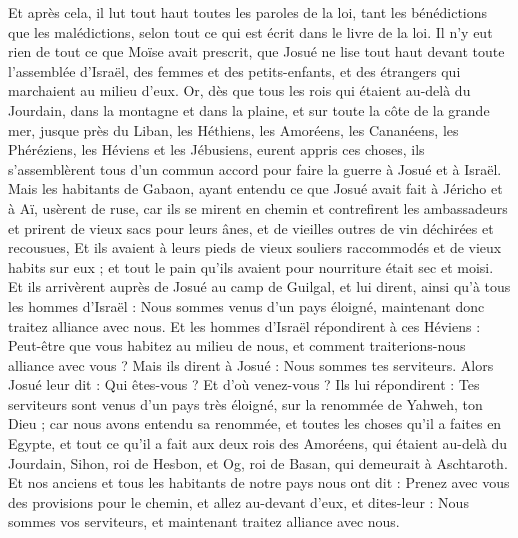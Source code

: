 \begin{multicols}{2}
Et après cela, il lut tout haut toutes les paroles de la loi, tant les bénédictions que les malédictions, selon tout ce qui est écrit dans le livre de la loi.
Il n'y eut rien de tout ce que Moïse avait prescrit, que Josué ne lise tout haut devant toute l'assemblée d'Israël, des femmes et des petits-enfants, et des étrangers qui marchaient au milieu d'eux.
\VerseOne{}Or, dès que  tous les rois qui étaient au-delà du Jourdain, dans la montagne et dans la plaine, et sur toute la côte de la grande mer, jusque près du Liban, les Héthiens, les Amoréens, les Cananéens, les Phéréziens, les Héviens et les Jébusiens, eurent appris ces choses,
ils s'assemblèrent tous d'un commun accord pour faire la guerre à Josué et à Israël.
Mais les habitants de Gabaon, ayant entendu ce que Josué avait fait à Jéricho et à Aï,
usèrent de ruse, car ils se mirent en chemin et contrefirent les ambassadeurs et prirent de vieux sacs pour leurs ânes, et de vieilles outres de vin déchirées et recousues,
Et ils avaient à leurs pieds de vieux souliers raccommodés et de vieux habits sur eux ; et tout le pain qu'ils avaient pour nourriture était sec et moisi.
Et ils arrivèrent auprès de Josué au camp de Guilgal, et lui dirent, ainsi qu'à tous les hommes d'Israël : Nous sommes venus d'un pays éloigné, maintenant donc traitez alliance avec nous.
Et les hommes d'Israël répondirent à ces Héviens : Peut-être que vous habitez au milieu de nous, et comment traiterions-nous alliance avec vous ?
Mais ils dirent à Josué : Nous sommes tes serviteurs. Alors Josué leur dit : Qui êtes-vous ? Et d'où venez-vous ?
Ils lui répondirent : Tes serviteurs sont venus d'un pays très éloigné, sur la renommée de Yahweh, ton Dieu ; car nous avons entendu sa renommée, et toutes les choses qu'il a faites en Egypte,
et tout ce qu'il a fait aux deux rois des Amoréens, qui étaient au-delà du Jourdain, Sihon, roi de Hesbon, et Og, roi de Basan, qui demeurait à Aschtaroth.
Et nos anciens et tous les habitants de notre pays nous ont dit : Prenez avec vous des provisions pour le chemin, et allez au-devant d'eux, et dites-leur : Nous sommes vos serviteurs, et maintenant traitez alliance avec nous.

\end{multicols}
